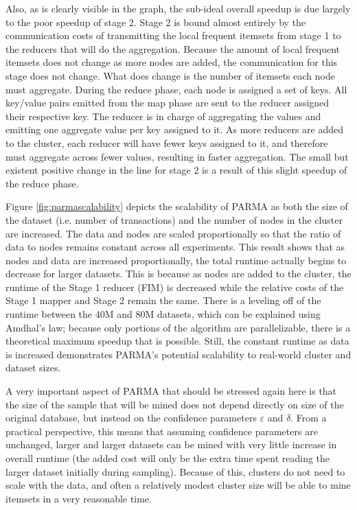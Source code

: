 Also, as is clearly visible in the graph, the sub-ideal overall
speedup is due largely to the poor speedup of stage 2. Stage 2 is
bound almost entirely by the communication costs of transmitting the
local frequent itemsets from stage 1 to the reducers that will do the
aggregation. Because the amount of local frequent itemsets does not
change as more nodes are added, the communication for this stage does
not change. What does change is the number of itemsets each node must
aggregate. During the reduce phase, each node is assigned a set of
keys. All key/value pairs emitted from the map phase are sent to the
reducer assigned their respective key. The reducer is in charge of
aggregating the values and emitting one aggregate value per key assigned
to it. As more reducers are added to the cluster, each reducer will
have fewer keys assigned to it, and therefore must aggregate across
fewer values, resulting in faster aggregation. The small but existent positive
change in the line for stage 2 is a result of this slight speedup of the reduce
phase. 

Figure \ref{fig:parmascalability} depicts the scalability of PARMA as both
the size of the dataset (i.e. number of transactions) and the number of
nodes in the cluster are increased. The data and nodes are scaled
proportionally so that the ratio of data to nodes remains constant
across all experiments. This result shows that as nodes and data are
increased proportionally, the total runtime actually begins to decrease
for larger datasets. This is because as nodes are added to the cluster, the runtime of
the Stage 1 reducer (FIM) is decreased while the relative costs of
the Stage 1 mapper and Stage 2 remain the same. There is a leveling
off of the runtime between the 40M and 80M datasets, which can be
explained using Amdhal's law; because only portions of the algorithm
are parallelizable, there is a theoretical maximum speedup that is
possible. Still, the constant runtime as data is increased
demonstrates PARMA's potential scalability to real-world cluster and
dataset sizes. 

A very important aspect of PARMA that should be stressed again
here is that the size of the sample that will be mined does not depend
directly on size of the original database, but instead on the
confidence parameters $\varepsilon$ and $\delta$. From a practical
perspective, this means that assuming confidence parameters are
unchanged, larger and larger datasets can be mined with very little
increase in overall runtime (the added cost will only be the extra
time spent reading the larger dataset initially during
sampling). Because of this, clusters do not need to scale
with the data, and often a relatively modest cluster size will be
able to mine itemsets in a very reasonable time. 


